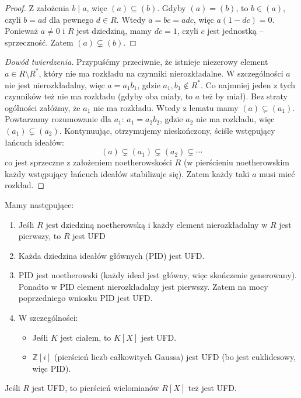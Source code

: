 \begin{proof}
Z założenia $b \mid a$, więc $(a) \subseteq (b)$. Gdyby $(a) = (b)$, to $b \in (a)$, czyli $b = ad$ dla pewnego $d \in R$. Wtedy $a = bc = adc$, więc $a(1-dc)=0$. Ponieważ $a \neq 0$ i $R$ jest dziedziną, mamy $dc = 1$, czyli $c$ jest jednostką – sprzeczność. Zatem $(a) \subsetneq (b)$.
\end{proof}

\begin{proof}[Dowód twierdzenia]
Przypuśćmy przeciwnie, że istnieje niezerowy element $a \in R \setminus R^*$, który nie ma rozkładu na czynniki nierozkładalne. W szczególności $a$ nie jest nierozkładalny, więc $a = a_1 b_1$, gdzie $a_1, b_1 \notin R^*$. Co najmniej jeden z tych czynników też nie ma rozkładu (gdyby oba miały, to $a$ też by miał). Bez straty ogólności załóżmy, że $a_1$ nie ma rozkładu. Wtedy z lematu mamy $(a) \subsetneq (a_1)$. Powtarzamy rozumowanie dla $a_1$: $a_1 = a_2 b_2$, gdzie $a_2$ nie ma rozkładu, więc $(a_1) \subsetneq (a_2)$. Kontynuując, otrzymujemy nieskończony, ściśle wstępujący łańcuch ideałów:
\[
(a) \subsetneq (a_1) \subsetneq (a_2) \subsetneq \cdots
\]
co jest sprzeczne z założeniem noetherowskości $R$ (w pierścieniu noetherowskim każdy wstępujący łańcuch ideałów stabilizuje się). Zatem każdy taki $a$ musi mieć rozkład.
\end{proof}

\begin{corollary}
Mamy następujące:
	
\begin{enumerate}[label=\arabic*)]
	\item Jeśli $R$ jest dziedziną noetherowską i każdy element nierozkładalny w $R$ jest pierwszy, to $R$ jest UFD
	\item Każda dziedzina ideałów głównych (PID) jest UFD.
	\item PID jest noetherowski (każdy ideał jest główny, więc skończenie generowany). Ponadto w PID element nierozkładalny jest pierwszy. Zatem na mocy poprzedniego wniosku PID jest UFD.
	\item W szczególności:
		\begin{itemize}
    			\item Jeśli $K$ jest ciałem, to $K[X]$ jest UFD.
    			\item $\mathbb{Z}[i]$ (pierścień liczb całkowitych Gaussa) jest UFD (bo jest euklidesowy, więc PID).
		\end{itemize}
\end{enumerate}
\end{corollary}
\begin{theorem}
Jeśli $R$ jest UFD, to pierścień wielomianów $R[X]$ też jest UFD.
\end{theorem}

